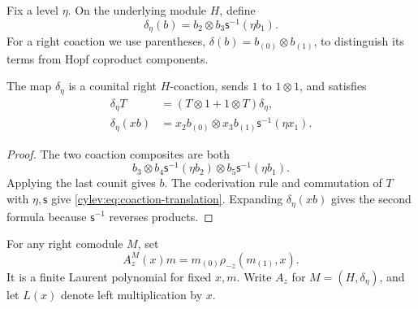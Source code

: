 Fix a level $\eta$. On the underlying module $H$, define
\begin{equation}\label{cylev:eq:coaction}
 \delta_\eta(b)=b_2\otimes b_3\mathsf s^{-1}(\eta b_1).
\end{equation}
For a right coaction we use parentheses,
$\delta(b)=b_{(0)}\otimes b_{(1)}$, to distinguish its terms from
Hopf coproduct components.

\begin{lemma}\label{cylev:lem:coaction}
The map $\delta_\eta$ is a counital right $H$-coaction, sends $1$ to
$1\otimes1$, and satisfies
\begin{align}
 \delta_\eta T&=(T\otimes1+1\otimes T)\delta_\eta,
       \label{cylev:eq:coaction-translation}\\
 \delta_\eta(xb)&=x_2b_{(0)}\otimes
          x_3b_{(1)}\mathsf s^{-1}(\eta x_1).
       \label{cylev:eq:coaction-product}
\end{align}
\end{lemma}
\begin{proof}
The two coaction composites are both
\[
 b_3\otimes b_4\mathsf s^{-1}(\eta b_2)
       \otimes b_5\mathsf s^{-1}(\eta b_1).
\]
Applying the last counit gives $b$.
The coderivation rule and commutation of $T$ with $\eta,\mathsf s$
give \eqref{cylev:eq:coaction-translation}.
Expanding $\delta_\eta(xb)$ gives the second formula because
$\mathsf s^{-1}$ reverses products.
\end{proof}

For any right comodule $M$, set
\begin{equation}\label{cylev:eq:annihilation}
 A_z^M(x)m=m_{(0)}\rho_{-z}(m_{(1)},x).
\end{equation}
It is a finite Laurent polynomial for fixed $x,m$.
Write $A_z$ for $M=(H,\delta_\eta)$, and let $L(x)$ denote
left multiplication by $x$.

